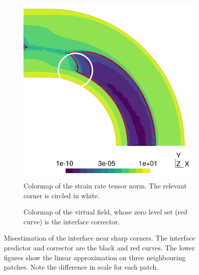 \documentclass[11 pt]{report}
\begin{document}
\begin{figure}
    \centering
    \begin{subfigure}[t]{0.495\textwidth}
        \includegraphics[width=\textwidth]{../figures/corner_5.pdf}
        \caption{Colormap of the strain rate tensor norm. The relevant corner is circled in white.}
    \end{subfigure}
    \begin{subfigure}[t]{0.495\textwidth}
        
        \caption{Colormap of the virtual field, whose zero level set (red curve) is the interface corrector.}
    \end{subfigure}\vspace{6pt}
    \begin{subfigure}[t]{0.325\textwidth}
        
    \end{subfigure}
    \begin{subfigure}[t]{0.325\textwidth}
        
    \end{subfigure}
    \begin{subfigure}[t]{0.325\textwidth}
        
    \end{subfigure}\vspace{6pt}
    \caption{Misestimation of the interface near sharp corners. The interface predictor and corrector are the black and red curves. The lower figures show the linear approximation on three neighbouring patches. Note the difference in scale for each patch.}
    \label{fig:failureCorner}
\end{figure}
\end{document}
